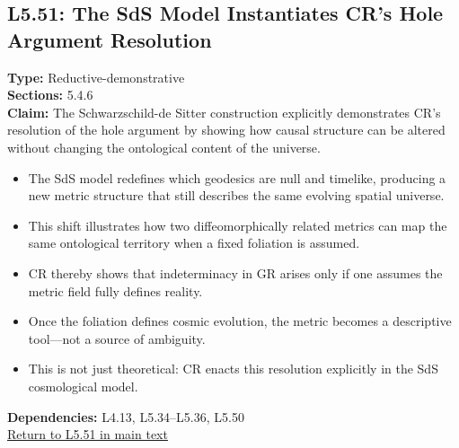 \documentclass[12pt]{book}
\newcommand{\returnlink}[1]{\hyperref[logic:#1]{Return to #1 in main text}\xspace}
\begin{document}
\subsection*{L5.51: The SdS Model Instantiates CR's Hole Argument Resolution}
\label{appendix:L5.51}
\textbf{Type:} Reductive-demonstrative \\
\textbf{Sections:} 5.4.6 \\
\textbf{Claim:} The Schwarzschild-de Sitter construction explicitly demonstrates CR's resolution of the hole argument by showing how causal structure can be altered without changing the ontological content of the universe.
\begin{itemize}
  \item The SdS model redefines which geodesics are null and timelike, producing a new metric structure that still describes the same evolving spatial universe.
  \item This shift illustrates how two diffeomorphically related metrics can map the same ontological territory when a fixed foliation is assumed.
  \item CR thereby shows that indeterminacy in GR arises only if one assumes the metric field fully defines reality.
  \item Once the foliation defines cosmic evolution, the metric becomes a descriptive tool---not a source of ambiguity.
  \item This is not just theoretical: CR enacts this resolution explicitly in the SdS cosmological model.
\end{itemize}
\textbf{Dependencies:} L4.13, L5.34–L5.36, L5.50 \\
\returnlink{L5.51}
\end{document}
